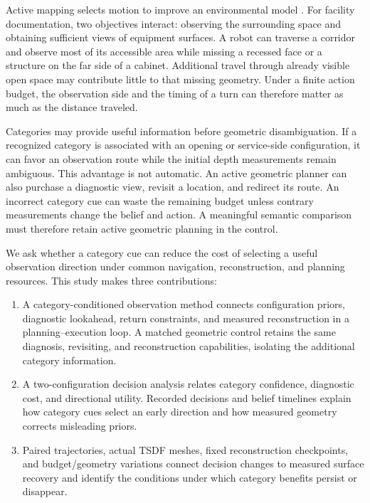 \documentclass[pdflatex,sn-mathphys-num]{sn-jnl}
\providecommand{\tightlist}{\setlength{\itemsep}{0pt}\setlength{\parskip}{0pt}}
\begin{document}
Active mapping selects motion to improve an environmental model \cite{ref10}. For facility documentation, two objectives interact: observing the surrounding space and obtaining sufficient views of equipment surfaces. A robot can traverse a corridor and observe most of its accessible area while missing a recessed face or a structure on the far side of a cabinet. Additional travel through already visible open space may contribute little to that missing geometry. Under a finite action budget, the observation side and the timing of a turn can therefore matter as much as the distance traveled.

Categories may provide useful information before geometric disambiguation. If a recognized category is associated with an opening or service-side configuration, it can favor an observation route while the initial depth measurements remain ambiguous. This advantage is not automatic. An active geometric planner can also purchase a diagnostic view, revisit a location, and redirect its route. An incorrect category cue can waste the remaining budget unless contrary measurements change the belief and action. A meaningful semantic comparison must therefore retain active geometric planning in the control.

We ask whether a category cue can reduce the cost of selecting a useful observation direction under common navigation, reconstruction, and planning resources. This study makes three contributions:

\begin{enumerate}
\def\labelenumi{\arabic{enumi}.}
\tightlist
\item
  A category-conditioned observation method connects configuration priors, diagnostic lookahead, return constraints, and measured reconstruction in a planning--execution loop. A matched geometric control retains the same diagnosis, revisiting, and reconstruction capabilities, isolating the additional category information.
\item
  A two-configuration decision analysis relates category confidence, diagnostic cost, and directional utility. Recorded decisions and belief timelines explain how category cues select an early direction and how measured geometry corrects misleading priors.
\item
  Paired trajectories, actual TSDF meshes, fixed reconstruction checkpoints, and budget/geometry variations connect decision changes to measured surface recovery and identify the conditions under which category benefits persist or disappear.
\end{enumerate}
\end{document}
